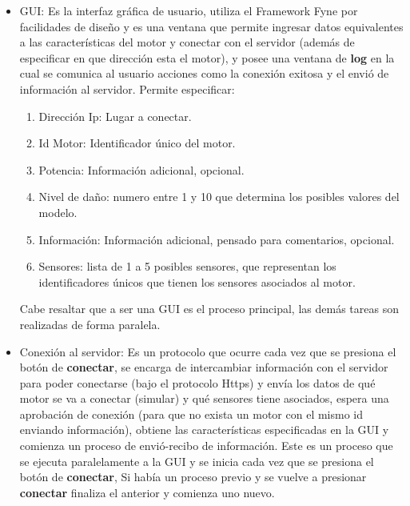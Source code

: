 \begin{itemize}
    \item GUI: Es la interfaz gráfica de usuario, utiliza el Framework Fyne por
        facilidades
        de diseño y es una ventana que permite ingresar datos equivalentes
        a las características del motor y conectar con el servidor (además de
        especificar en que dirección esta el motor), y posee una ventana de
        \textbf{log}  en la cual se comunica al usuario acciones como la conexión exitosa y
        el envió de información al servidor. Permite especificar:
        \begin{enumerate}
            \item Dirección Ip: Lugar a conectar.
            \item Id Motor: Identificador único del motor.
            \item Potencia: Información adicional, opcional.
            \item Nivel de daño: numero entre 1 y 10 que determina los posibles
                valores del modelo.
            \item Información: Información adicional, pensado para comentarios,
                opcional.
            \item Sensores: lista de 1 a 5 posibles sensores, que representan
                los identificadores únicos que tienen los sensores asociados
                al motor.
        \end{enumerate}

        Cabe resaltar que a ser una GUI es el proceso principal, las demás
        tareas son realizadas de forma paralela.

    \item Conexión al servidor: Es un protocolo que ocurre cada vez que se presiona
        el botón de \textbf{conectar}, se encarga de intercambiar información con el servidor
        para poder conectarse (bajo el protocolo Https) y envía los datos de
        qué motor se va a conectar (simular) y qué sensores tiene asociados, espera
        una aprobación de conexión (para que no exista un motor con el mismo id enviando
        información), obtiene las características especificadas en la GUI y
        comienza un proceso de envió-recibo de información.
        Este es un proceso
        que se ejecuta paralelamente a la GUI y se inicia cada vez que se
        presiona el botón de \textbf{conectar}, Si había un proceso previo y se vuelve a
        presionar \textbf{conectar} finaliza el anterior y comienza uno nuevo.


\end{itemize}
